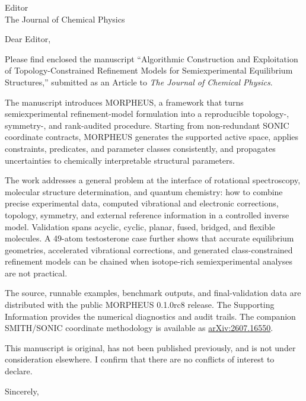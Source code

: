 \documentclass[11pt]{letter}
\begin{document}
\begin{letter}{Editor\\
The Journal of Chemical Physics}

\opening{Dear Editor,}

Please find enclosed the manuscript ``Algorithmic Construction and Exploitation
of Topology-Constrained Refinement Models for Semiexperimental Equilibrium
Structures,'' submitted as an Article to \emph{The Journal of Chemical
Physics}.

The manuscript introduces MORPHEUS, a framework that turns semiexperimental
refinement-model formulation into a reproducible topology-, symmetry-, and
rank-audited procedure. Starting from non-redundant SONIC coordinate contracts,
MORPHEUS generates the supported active space, applies constraints, predicates,
and parameter classes consistently, and propagates uncertainties to chemically
interpretable structural parameters.

The work addresses a general problem at the interface of rotational
spectroscopy, molecular structure determination, and quantum chemistry: how to
combine precise experimental data, computed vibrational and electronic
corrections, topology, symmetry, and external reference information in a
controlled inverse model. Validation spans acyclic, cyclic, planar, fused,
bridged, and flexible molecules. A 49-atom testosterone case further shows that
accurate equilibrium geometries, accelerated vibrational corrections, and
generated class-constrained refinement models can be chained when isotope-rich
semiexperimental analyses are not practical.

The source, runnable examples, benchmark outputs, and final-validation data are
distributed with the public MORPHEUS 0.1.0rc8 release. The Supporting
Information provides the numerical diagnostics and audit trails. The companion
SMITH/SONIC coordinate methodology is available as
\href{https://arxiv.org/abs/2607.16550}{arXiv:2607.16550}.

This manuscript is original, has not been published previously, and is not
under consideration elsewhere. I confirm that there are no conflicts of
interest to declare.

\closing{Sincerely,}

\end{letter}
\end{document}
